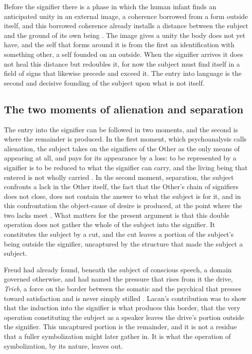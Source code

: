 Before the signifier there is a phase in which the human infant finds an anticipated unity in an external image, a coherence borrowed from a form outside itself, and this borrowed coherence already installs a distance between the subject and the ground of its own being \parencite{lacan2006ecrits}. The image gives a unity the body does not yet have, and the self that forms around it is from the first an identification with something other, a self founded on an outside. When the signifier arrives it does not heal this distance but redoubles it, for now the subject must find itself in a field of signs that likewise precede and exceed it. The entry into language is the second and decisive founding of the subject upon what is not itself.

\subsection*{The two moments of alienation and separation}

The entry into the signifier can be followed in two moments, and the second is where the remainder is produced. In the first moment, which psychoanalysis calls alienation, the subject takes on the signifiers of the Other as the only means of appearing at all, and pays for its appearance by a loss: to be represented by a signifier is to be reduced to what the signifier can carry, and the living being that entered is not wholly carried \parencite{lacan1977xi}. In the second moment, separation, the subject confronts a lack in the Other itself, the fact that the Other's chain of signifiers does not close, does not contain the answer to what the subject is for it, and in this confrontation the object-cause of desire is produced, at the point where the two lacks meet \parencite{fink1995subject}. What matters for the present argument is that this double operation does not gather the whole of the subject into the signifier. It constitutes the subject by a cut, and the cut leaves a portion of the subject's being outside the signifier, uncaptured by the structure that made the subject a subject.

Freud had already found, beneath the subject of conscious speech, a domain governed otherwise, and had named the pressure that rises from it the drive, \emph{Trieb}, a force on the border between the somatic and the psychical that presses toward satisfaction and is never simply stilled \parencite{freud1915instincts}. Lacan's contribution was to show that the induction into the signifier is what produces this border, that the very operation constituting the subject as a speaker leaves the drive's portion outside the signifier. This uncaptured portion is the remainder, and it is not a residue that a fuller symbolization might later gather in. It is what the operation of symbolization, by its nature, leaves out.

